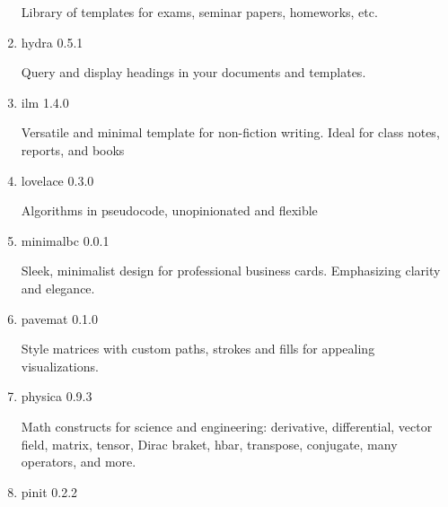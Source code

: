 \begin{enumerate}
  Library of templates for exams, seminar papers, homeworks, etc.

  { }
\item
  \href{/universe/package/hydra/}{}

  { hydra } { 0.5.1 }

  Query and display headings in your documents and templates.

  { }
\item
  \href{/universe/package/ilm/}{}


  { ilm } { 1.4.0 }

  Versatile and minimal template for non-fiction writing. Ideal for
  class notes, reports, and books

  { }
\item
  \href{/universe/package/lovelace/}{}

  { lovelace } { 0.3.0 }

  Algorithms in pseudocode, unopinionated and flexible

  { }
\item
  \href{/universe/package/minimalbc/}{}


  { minimalbc } { 0.0.1 }

  Sleek, minimalist design for professional business cards. Emphasizing
  clarity and elegance.

  { }
\item
  \href{/universe/package/pavemat/}{}

  { pavemat } { 0.1.0 }

  Style matrices with custom paths, strokes and fills for appealing
  visualizations.

  { }
\item
  \href{/universe/package/physica/}{}

  { physica } { 0.9.3 }

  Math constructs for science and engineering: derivative, differential,
  vector field, matrix, tensor, Dirac braket, hbar, transpose,
  conjugate, many operators, and more.

  { }
\item
  \href{/universe/package/pinit/}{}

  { pinit } { 0.2.2 }


\end{enumerate}

